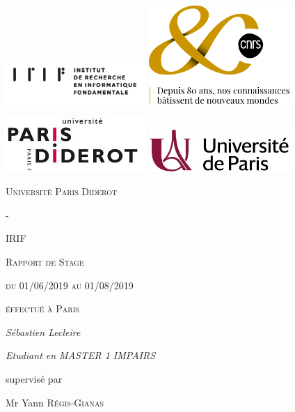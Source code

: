 \documentclass{article}
\begin{document}
\begin{titlepage}
	\centering
	\includegraphics[width=0.4\textwidth]{irif_horizontal}
	\includegraphics[width=0.4\textwidth]{Logo80ANS_OR}\par\vspace{1cm}
	\includegraphics[width=0.4\textwidth]{logop7}
	\includegraphics[width=0.4\textwidth]{Universite_Paris_logo_horizontal}\par\vspace{1cm}
	{\scshape\LARGE Université Paris Diderot \par}
	{\scshape\Large -\par}

	{\scshape\LARGE IRIF \par}
	\vspace{1cm}
	{\scshape\Large Rapport de Stage\par}
	{\scshape\Large du 01/06/2019 au 01/08/2019\par}
	\vspace{1.5cm}
	{\scshape\Large éffectué à Paris\par}
	\vspace{1.5cm}
	{\Large\itshape Sébastien Lecleire\par}
	{\Large\itshape Etudiant en MASTER 1 IMPAIRS\par}
	\vfill
	supervisé par\par
	Mr Yann \textsc{Régis-Gianas}

	\vfill
\end{titlepage}
\end{document}
